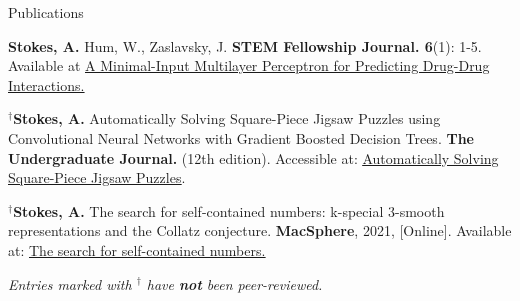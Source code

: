 \begin{rSection}{Publications}
\begin{enumerate}[label={[\arabic*]}]
  \item {\bf Stokes, A.} Hum, W., Zaslavsky, J. \textbf{STEM Fellowship Journal. 6}(1): 1-5. Available at \underline{\href{https://journal.stemfellowship.org/doi/10.17975/sfj-2020-006}{A Minimal-Input Multilayer Perceptron for Predicting Drug-Drug Interactions.}}
  
  \item $^\dagger${\bf Stokes, A.} Automatically Solving Square-Piece Jigsaw Puzzles using Convolutional Neural Networks with Gradient Boosted Decision Trees. \textbf{The Undergraduate Journal.} (12th edition). Accessible at: \underline{\href{https://gua.soutron.net/Portal/Default/en-GB/RecordView/Index/61}{Automatically Solving Square-Piece Jigsaw Puzzles}}.
  \item $^\dagger${\bf Stokes, A.} The search for self-contained numbers: k-special 3-smooth representations and the Collatz conjecture. \textbf{MacSphere}, 2021, [Online]. Available at: \underline{\href{https://macsphere.mcmaster.ca/handle/11375/27543}{The search for self-contained numbers.}}

\end{enumerate}

\smallskip
{\em Entries marked with $^\dagger$ have \textbf{not} been peer-reviewed.}

\end{rSection}